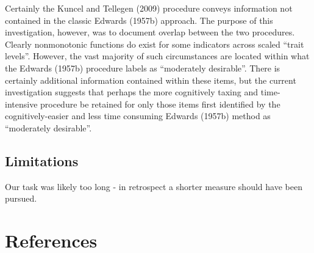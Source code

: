 \documentclass[
  ,jou]{apa6}
\begin{document}
Certainly the Kuncel and Tellegen (2009) procedure conveys information not contained in the classic Edwards (1957b) approach. The purpose of this investigation, however, was to document overlap between the two procedures. Clearly nonmonotonic functions do exist for some indicators across scaled ``trait levels''. However, the vast majority of such circumstances are located within what the Edwards (1957b) procedure labels as ``moderately desirable''. There is certainly additional information contained within these items, but the current investigation suggests that perhaps the more cognitively taxing and time-intensive procedure be retained for only those items first identified by the cognitively-easier and less time consuming Edwards (1957b) method as ``moderately desirable''.

\hypertarget{limitations}{%
\subsection{Limitations}\label{limitations}}

Our task was likely too long - in retrospect a shorter measure should have been pursued.

\hypertarget{references}{%
\section{References}\label{references}}

\begingroup
\setlength{\parindent}{-0.5in}
\setlength{\leftskip}{0.5in}
\end{document}
